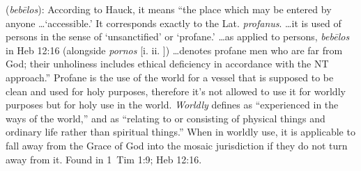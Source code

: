 \item[Profane,]

(\textit{bebēlos}):
According to Hauck, it means ``the place which may be entered by anyone \ldots `accessible.' It corresponds exactly to the Lat. \emph{profanus}. \ldots it is used of persons in the sense of `unsanctified' or `profane.' \ldots as applied to persons, \emph{bebēlos} in Heb 12:16 (alongside \emph{pornos} [i.  ii. ]) \ldots denotes profane men who are far from God; their unholiness includes ethical deficiency in accordance with the NT approach.''
Profane is the use of the world for a vessel that is supposed to be clean and used for holy purposes, therefore it's not allowed to use it for worldly purposes but for holy use in the world.
\emph{Worldly} defines as ``experienced in the ways of the world,'' and as ``relating to or consisting of physical things and ordinary life rather than spiritual things.'' When in worldly use, it is applicable to fall away from the Grace of God into the mosaic jurisdiction if they do not turn away from it.
Found in 1~Tim 1:9; Heb 12:16.
